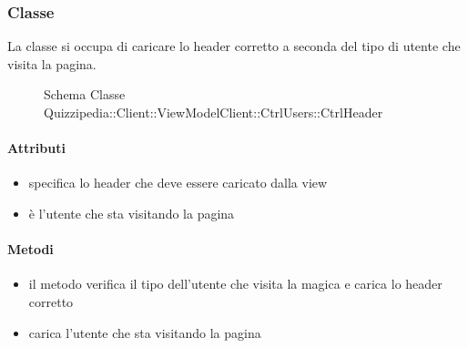 \subsubsection{Classe }
La classe si occupa di caricare lo header corretto a seconda del tipo di utente che visita la pagina.
\begin{figure}[H]
\centering
\noindent{}
\caption[Schema Classe CtrlHeader]{Schema Classe Quizzipedia::Client::ViewModelClient::CtrlUsers::CtrlHeader}
\end{figure}
\paragraph{Attributi}
\begin{itemize}
\item {}
\newline
specifica lo header che deve essere caricato dalla view
\item {}
\newline
è l'utente che sta visitando la pagina
\end{itemize}
\paragraph{Metodi}
\begin{itemize}
\item {}
\newline
il metodo verifica il tipo dell'utente che visita la magica e carica lo header corretto
\newline
\item {}
\newline
carica l'utente che sta visitando la pagina
\newline
\end{itemize}
